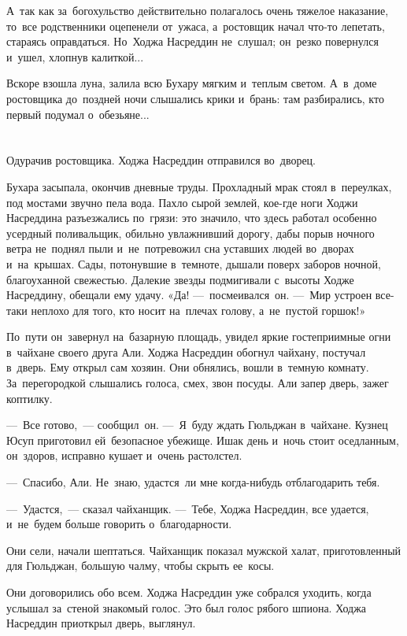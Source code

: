 \documentclass[12pt,a4paper]{book}
\begin{document}
А~так как за~богохульство действительно полагалось очень тяжелое наказание, то~все родственники оцепенели от~ужаса, а~ростовщик начал что-то лепетать, стараясь оправдаться. Но~Ходжа Насреддин не~слушал; он~резко повернулся и~ушел, хлопнув калиткой...

Вскоре взошла луна, залила всю Бухару мягким и~теплым светом. А~в~доме ростовщика до~поздней ночи слышались крики и~брань: там разбирались, кто первый подумал о~обезьяне...


\chapter{}

Одурачив ростовщика. Ходжа Насреддин отправился во~дворец.

Бухара засыпала, окончив дневные труды. Прохладный мрак стоял в~переулках, под мостами звучно пела вода. Пахло сырой землей, кое-где ноги Ходжи Насреддина разъезжались по~грязи: это значило, что здесь работал особенно усердный поливальщик, обильно увлажнивший дорогу, дабы порыв ночного ветра не~поднял пыли и~не~потревожил сна уставших людей во~дворах и~на~крышах. Сады, потонувшие в~темноте, дышали поверх заборов ночной, благоуханной свежестью. Далекие звезды подмигивали с~высоты Ходже Насреддину, обещали ему удачу. «Да! —~посмеивался~он. —~Мир устроен все-таки неплохо для того, кто носит на~плечах голову, а~не~пустой горшок!»

По~пути он~завернул на~базарную площадь, увидел яркие гостеприимные огни в~чайхане своего друга Али. Ходжа Насреддин обогнул чайхану, постучал в~дверь. Ему открыл сам хозяин. Они обнялись, вошли в~темную комнату. За~перегородкой слышались голоса, смех, звон посуды. Али запер дверь, зажег коптилку.

—~Все готово,~— сообщил~он. —~Я~буду ждать Гюльджан в~чайхане. Кузнец Юсуп приготовил ей~безопасное убежище. Ишак день и~ночь стоит оседланным, он~здоров, исправно кушает и~очень растолстел.

—~Спасибо, Али. Не~знаю, удастся~ли мне когда-нибудь отблагодарить тебя.

—~Удастся,~— сказал чайханщик. —~Тебе, Ходжа Насреддин, все удается, и~не~будем больше говорить о~благодарности.

Они сели, начали шептаться. Чайханщик показал мужской халат, приготовленный для Гюльджан, большую чалму, чтобы скрыть ее~косы.

Они договорились обо всем. Ходжа Насреддин уже собрался уходить, когда услышал за~стеной знакомый голос. Это был голос рябого шпиона. Ходжа Насреддин приоткрыл дверь, выглянул.
\end{document}
